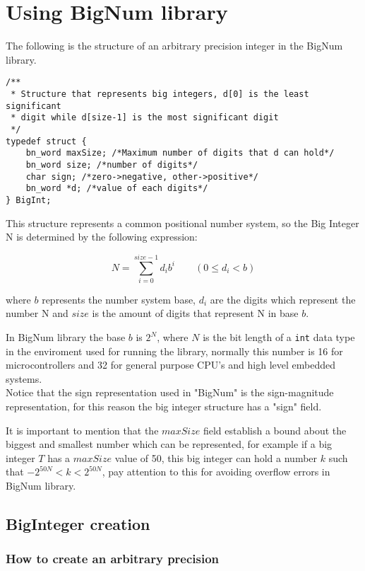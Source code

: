 \documentclass{book}
\begin{document}
\chapter{Using BigNum library}
\label{chap:api}
The following is the structure of an arbitrary precision integer in the BigNum library.
\begin{verbatim}
/**
 * Structure that represents big integers, d[0] is the least significant
 * digit while d[size-1] is the most significant digit
 */
typedef struct {
    bn_word maxSize; /*Maximum number of digits that d can hold*/
    bn_word size; /*number of digits*/
    char sign; /*zero->negative, other->positive*/
    bn_word *d; /*value of each digits*/
} BigInt;
\end{verbatim}

This structure represents a common positional number system, so the Big Integer N is determined by the following expression:

\[N = \sum_{i=0}^{size-1}{d_i b^i} \quad\quad (0 \le d_i < b) \]

where $b$ represents the number system base, $d_i$  are the digits which represent the number N and $size$ is the amount of digits that represent N in base $b$.

In BigNum library the base $b$ is $2^N$, where $N$ is the bit length of a \verb+int+ data type in the enviroment used for running the library, normally this number is 16 for microcontrollers and 32 for general purpose CPU's and high level embedded systems.\\

Notice that the sign representation used in "BigNum" is the sign-magnitude representation, for this reason the big integer structure has a "sign" field.

It is important to mention that the $maxSize$ field establish a bound about the biggest and smallest number which can be represented, for example if a big integer $T$ has a $maxSize$ value of 50, this big integer can hold a number $k$ such that $-2^{50N}<k<2^{50N}$, pay attention to this for avoiding overflow errors in BigNum library.

\section{BigInteger creation}

\subsection{How to create an arbitrary precision }
\end{document}
